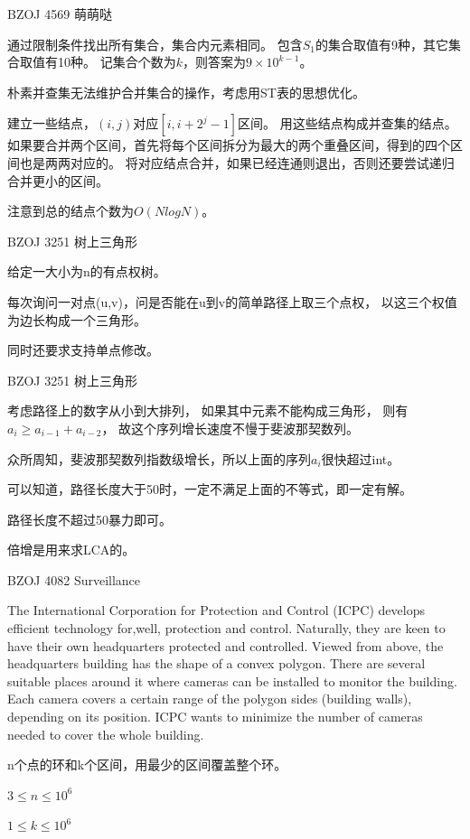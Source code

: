 \documentclass{beamer}
\begin{document}
\begin{frame}{BZOJ 4569 萌萌哒}

    通过限制条件找出所有集合，集合内元素相同。
    包含$S_1$的集合取值有9种，其它集合取值有10种。
    记集合个数为$k$，则答案为$9\times 10^{k-1}$。

    朴素并查集无法维护合并集合的操作，考虑用ST表的思想优化。

    建立一些结点，$(i,j)$对应$[i,i+2^j-1]$区间。
    用这些结点构成并查集的结点。
    如果要合并两个区间，首先将每个区间拆分为最大的两个重叠区间，得到的四个区间也是两两对应的。
    将对应结点合并，如果已经连通则退出，否则还要尝试递归合并更小的区间。

    注意到总的结点个数为$O(NlogN)$。

\end{frame}

\begin{frame}{BZOJ 3251 树上三角形}

    给定一大小为n的有点权树。
    
    每次询问一对点(u,v)，问是否能在u到v的简单路径上取三个点权，
    以这三个权值为边长构成一个三角形。
    
    同时还要求支持单点修改。
    
\end{frame}

\begin{frame}{BZOJ 3251 树上三角形}

    考虑路径上的数字从小到大排列，
    如果其中元素不能构成三角形，
    则有$a_i\geq a_{i-1} + a_{i-2}$，
    故这个序列增长速度不慢于斐波那契数列。

    众所周知，斐波那契数列指数级增长，所以上面的序列$a_i$很快超过int。

    可以知道，路径长度大于50时，一定不满足上面的不等式，即一定有解。
    
    路径长度不超过50暴力即可。

    倍增是用来求LCA的。
    
\end{frame}

\begin{frame}{BZOJ 4082 Surveillance}

    The International Corporation for Protection and Control (ICPC) develops efficient technology for,well, protection and control. Naturally, they are keen to have their own headquarters protected and controlled. Viewed from above, the headquarters building has the shape of a convex polygon. There are several suitable places around it where cameras can be installed to monitor the building. Each camera covers a certain range of the polygon sides (building walls), depending on its position. ICPC wants to minimize the number of cameras needed to cover the whole building.

    n个点的环和k个区间，用最少的区间覆盖整个环。

    $3 \leq n \leq 10^6$

    $1 \leq k \leq 10^6$

\end{frame}
\end{document}

